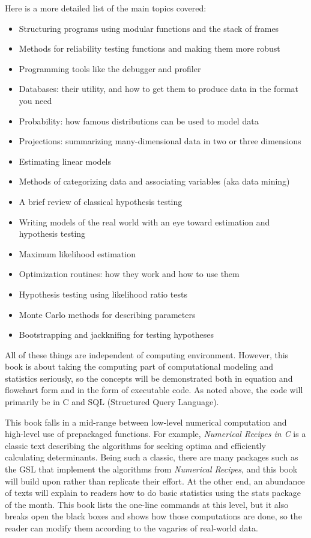 Here is a more detailed list of the main topics covered:
\begin{itemize}
\itemsep 0pt
\item Structuring programs using modular functions and the stack of frames
\item Methods for reliability testing functions and making them more robust
\item Programming tools like the debugger and profiler
\item Databases: their utility, and how to get them to produce data in
the format you need
\item Probability: how famous distributions can be used to model data
\item Projections: summarizing many-dimensional data in two or three
dimensions
\item Estimating linear models
\item Methods of categorizing data and associating variables (aka data mining)
\item A brief review of classical hypothesis testing 
\item Writing models of the real world with an eye toward estimation and
hypothesis testing
\item Maximum likelihood estimation
\item Optimization routines: how they work and how to use them
\item Hypothesis testing using likelihood ratio tests
\item Monte Carlo methods for describing parameters
\item Bootstrapping and jackknifing for testing hypotheses
\end{itemize}

All of these things are independent of computing environment. However,
this book is about taking the computing part of computational modeling
and statistics seriously, so the concepts will be demonstrated both
in equation and flowchart form and in the form of executable code. As
noted above, the code will primarily be in C and SQL (Structured Query
Language).

This book falls in a mid-range between low-level numerical
computation and high-level use of prepackaged functions. For example,
{\sl Numerical Recipes in C} \citep{recipesinc} is a classic text
describing the algorithms for seeking optima and efficiently calculating
determinants. Being such a classic, there are many packages such as the
GSL that implement the algorithms from {\sl Numerical Recipes}, and this
book will build upon rather than replicate their effort. At the other
end, an abundance of texts will explain to readers how to do basic
statistics using the stats package of the month. This book lists the
one-line commands at this level, but it also breaks open the black boxes
and shows how those computations are done, so the reader can modify them
according to the vagaries of real-world data.

